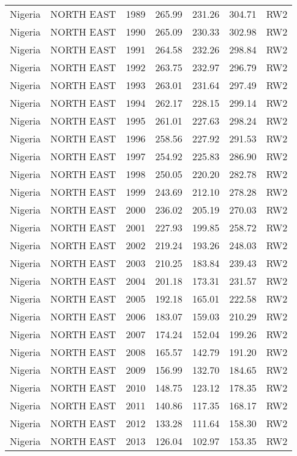 \begin{longtable}{lllrrrl}
  Nigeria & NORTH EAST & 1989 & 265.99 & 231.26 & 304.71 & RW2 \\ 
  Nigeria & NORTH EAST & 1990 & 265.09 & 230.33 & 302.98 & RW2 \\ 
  Nigeria & NORTH EAST & 1991 & 264.58 & 232.26 & 298.84 & RW2 \\ 
  Nigeria & NORTH EAST & 1992 & 263.75 & 232.97 & 296.79 & RW2 \\ 
  Nigeria & NORTH EAST & 1993 & 263.01 & 231.64 & 297.49 & RW2 \\ 
  Nigeria & NORTH EAST & 1994 & 262.17 & 228.15 & 299.14 & RW2 \\ 
  Nigeria & NORTH EAST & 1995 & 261.01 & 227.63 & 298.24 & RW2 \\ 
  Nigeria & NORTH EAST & 1996 & 258.56 & 227.92 & 291.53 & RW2 \\ 
  Nigeria & NORTH EAST & 1997 & 254.92 & 225.83 & 286.90 & RW2 \\ 
  Nigeria & NORTH EAST & 1998 & 250.05 & 220.20 & 282.78 & RW2 \\ 
  Nigeria & NORTH EAST & 1999 & 243.69 & 212.10 & 278.28 & RW2 \\ 
  Nigeria & NORTH EAST & 2000 & 236.02 & 205.19 & 270.03 & RW2 \\ 
  Nigeria & NORTH EAST & 2001 & 227.93 & 199.85 & 258.72 & RW2 \\ 
  Nigeria & NORTH EAST & 2002 & 219.24 & 193.26 & 248.03 & RW2 \\ 
  Nigeria & NORTH EAST & 2003 & 210.25 & 183.84 & 239.43 & RW2 \\ 
  Nigeria & NORTH EAST & 2004 & 201.18 & 173.31 & 231.57 & RW2 \\ 
  Nigeria & NORTH EAST & 2005 & 192.18 & 165.01 & 222.58 & RW2 \\ 
  Nigeria & NORTH EAST & 2006 & 183.07 & 159.03 & 210.29 & RW2 \\ 
  Nigeria & NORTH EAST & 2007 & 174.24 & 152.04 & 199.26 & RW2 \\ 
  Nigeria & NORTH EAST & 2008 & 165.57 & 142.79 & 191.20 & RW2 \\ 
  Nigeria & NORTH EAST & 2009 & 156.99 & 132.70 & 184.65 & RW2 \\ 
  Nigeria & NORTH EAST & 2010 & 148.75 & 123.12 & 178.35 & RW2 \\ 
  Nigeria & NORTH EAST & 2011 & 140.86 & 117.35 & 168.17 & RW2 \\ 
  Nigeria & NORTH EAST & 2012 & 133.28 & 111.64 & 158.30 & RW2 \\ 
  Nigeria & NORTH EAST & 2013 & 126.04 & 102.97 & 153.35 & RW2 \\ 

\end{longtable}
